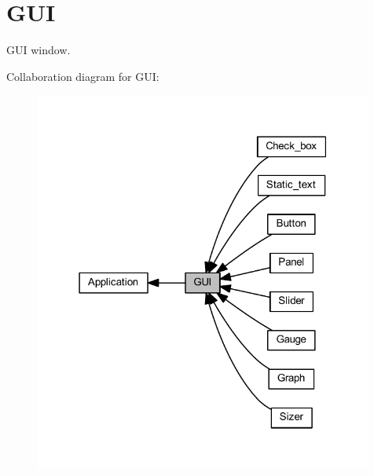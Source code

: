 \section{G\+UI}
\label{group___g_u_i}


G\+UI window.  


Collaboration diagram for G\+UI\+:\nopagebreak
\begin{figure}[H]
\begin{center}
\leavevmode
\includegraphics[width=315pt]{group___g_u_i}
\end{center}
\end{figure}
